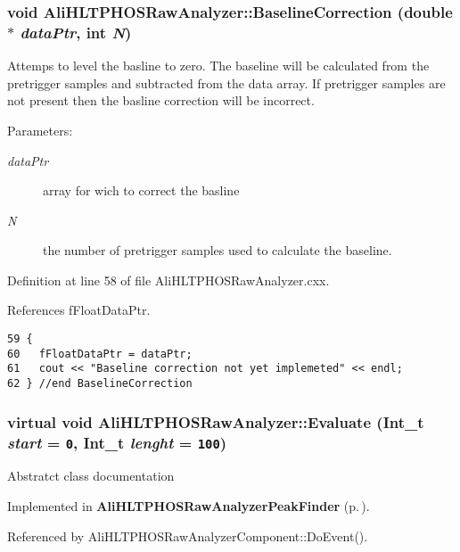 \subsubsection{\setlength{\rightskip}{0pt plus 5cm}void Ali\-HLTPHOSRaw\-Analyzer::Baseline\-Correction (double $\ast$ {\em data\-Ptr}, int {\em N})}\label{classAliHLTPHOSRawAnalyzer_a5}


Attemps to level the basline to zero. The baseline will be calculated from the pretrigger samples and subtracted from the data array. If pretrigger samples are not present then the basline correction will be incorrect. \begin{Desc}
\item[Parameters:]
\begin{description}
\item[{\em data\-Ptr}]array for wich to correct the basline \item[{\em N}]the number of pretrigger samples used to calculate the baseline. \end{description}
\end{Desc}


Definition at line 58 of file Ali\-HLTPHOSRaw\-Analyzer.cxx.

References f\-Float\-Data\-Ptr.

\footnotesize\begin{verbatim}59 {
60   fFloatDataPtr = dataPtr;  
61   cout << "Baseline correction not yet implemeted" << endl;
62 } //end BaselineCorrection
\end{verbatim}\normalsize 


\subsubsection{\setlength{\rightskip}{0pt plus 5cm}virtual void Ali\-HLTPHOSRaw\-Analyzer::Evaluate (Int\_\-t {\em start} = {\tt 0}, Int\_\-t {\em lenght} = {\tt 100})\hspace{0.3cm}{\tt  [pure virtual]}}\label{classAliHLTPHOSRawAnalyzer_a17}


Abstratct class documentation 

Implemented in {\bf Ali\-HLTPHOSRaw\-Analyzer\-Peak\-Finder} {\rm (p.\,\pageref{classAliHLTPHOSRawAnalyzerPeakFinder_a6})}.

Referenced by Ali\-HLTPHOSRaw\-Analyzer\-Component::Do\-Event().
